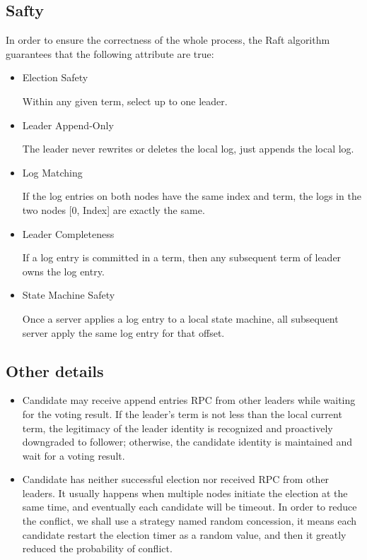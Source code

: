 \documentclass{report}
\begin{document}
\subsection{Safty}
In order to ensure the correctness of the whole process, the Raft algorithm guarantees that the following attribute are true:
\begin{itemize}
\item Election Safety\par
Within any given term, select up to one leader.
\item Leader Append-Only\par
The leader never rewrites or deletes the local log, just appends the local log.
\item Log Matching\par
If the log entries on both nodes have the same index and term, the logs in the two nodes [0, Index] are exactly the same.
\item Leader Completeness\par
If a log entry is committed in a term, then any subsequent term of leader owns the log entry.
\item State Machine Safety\par
Once a server applies a log entry to a local state machine, all subsequent server apply the same log entry for that offset.
\end{itemize}

\subsection{Other details}
\begin{itemize}
\item Candidate may receive append entries RPC from other leaders while waiting for the voting result. If the leader’s term is not less than the local current term, the legitimacy of the leader identity is recognized and proactively downgraded to follower; otherwise, the candidate identity is maintained and wait for a voting result.
\item Candidate has neither successful election nor received RPC from other leaders. It usually happens when multiple nodes initiate the election at the same time, and eventually each candidate will be timeout. In order to reduce the conflict, we shall use a strategy named random concession, it means each candidate restart the election timer as a random value, and then it greatly reduced the probability of conflict.
\end{itemize}
\end{document}
